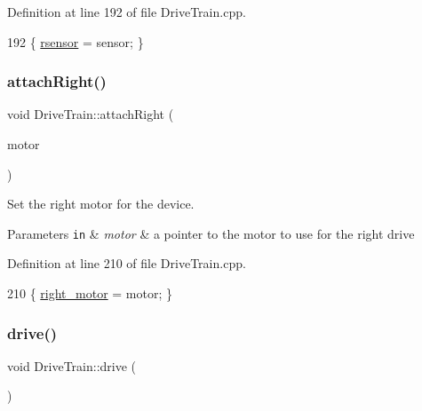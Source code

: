 Definition at line 192 of file Drive\+Train.\+cpp.


\begin{DoxyCode}
192 \{ \hyperlink{class_drive_train_a90f1f3d3f42a0ac4082df8e37541b71f}{rsensor} = sensor; \}
\end{DoxyCode}
\mbox{\label{class_drive_train_aae42a38cca31408dc00a10b45b667da6}} 
\subsubsection{\texorpdfstring{attach\+Right()}{attachRight()}}
{\footnotesize\ttfamily void Drive\+Train\+::attach\+Right (\begin{DoxyParamCaption}\item[{\hyperlink{class_pololu_motor}{Pololu\+Motor} $\ast$}]{motor }\end{DoxyParamCaption})}



Set the right motor for the device. 


\begin{DoxyParams}[1]{Parameters}
\mbox{\tt in}  & {\em motor} & a pointer to the motor to use for the right drive \\
\hline
\end{DoxyParams}


Definition at line 210 of file Drive\+Train.\+cpp.


\begin{DoxyCode}
210 \{ \hyperlink{class_drive_train_a499c068ddd578679ac5d654e2077fbc4}{right\_motor} = motor; \}
\end{DoxyCode}
\mbox{\label{class_drive_train_a53087c84c085d1f06b06d2e191e34882}} 
\subsubsection{\texorpdfstring{drive()}{drive()}}
{\footnotesize\ttfamily void Drive\+Train\+::drive (\begin{DoxyParamCaption}\item[{void}]{ }\end{DoxyParamCaption})}



